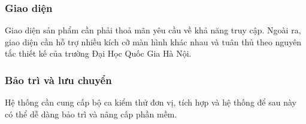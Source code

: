 \documentclass[./../main.tex]{subfiles}
\begin{document}
\hypertarget{giao-diux1ec7n}{%
	\subsubsection{Giao diện}\label{giao-diux1ec7n}}

Giao diện sản phẩm cần phải thoả mãn yêu cầu về khả năng truy cập. Ngoài
ra, giao diện cần hỗ trợ nhiều kích cỡ màn hình khác nhau và tuân thủ
theo nguyên tắc thiết kế của trường Đại Học Quốc Gia Hà Nội.

\hypertarget{bux1ea3o-truxec-vuxe0-lux1b0u-chuyux1ec3n}{%
	\subsubsection{Bảo trì và lưu
		chuyển}\label{bux1ea3o-truxec-vuxe0-lux1b0u-chuyux1ec3n}}

Hệ thống cần cung cấp bộ ca kiểm thử đơn vị, tích hợp và hệ thống để sau
này có thể dễ dàng bảo trì và nâng cấp phần mềm.
\end{document}
